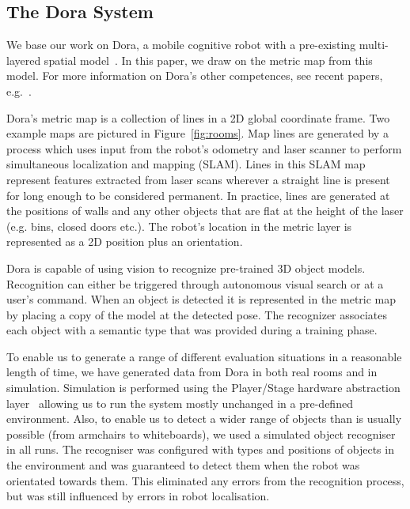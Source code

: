 \documentclass[letterpaper]{article}
\begin{document}
\subsection{The Dora System}

We base our work on Dora, a mobile cognitive robot with a pre-existing multi-layered spatial model~\cite{Hawes/etal:2011}. In this paper, we draw on the metric map from this model. For more information on Dora's other competences, see recent papers, e.g.~\cite{Hawes/etal:2011,Hanheide/etal:2011}.

Dora's metric map is a collection of lines in a 2D global coordinate frame. Two example maps are pictured in Figure~\ref{fig:rooms}. Map lines are generated by a process which uses input from the robot's odometry and laser scanner to perform simultaneous localization and mapping (SLAM). Lines in this SLAM map represent features extracted from laser scans wherever a straight line is present for long enough to be considered permanent. In practice, lines are generated at the positions of walls and any other objects that are flat at the height of the laser (e.g. bins, closed doors etc.). The robot's location in the metric layer is represented as a 2D position plus an orientation. 

Dora is capable of using vision to recognize pre-trained 3D object models. Recognition can either be triggered through autonomous visual search or at a user's command. When an object is detected it is represented in the metric map 
by placing a copy of the model at the detected pose. The recognizer associates each object with a semantic type that was provided during a training phase.

To enable us to generate a range of different evaluation situations in a reasonable length of time, we have generated data from Dora in both real rooms and in simulation. Simulation is performed using the Player/Stage hardware abstraction layer~\cite{GerkeyVaughanHoward03} allowing us to run the system mostly unchanged in a pre-defined environment. Also, to enable us to detect a wider range of objects than is usually possible (from armchairs to whiteboards), we used a simulated object recogniser in all runs. The recogniser was configured with types and positions of objects in the environment and was guaranteed to detect them when the robot was orientated towards them. This eliminated any errors from the recognition process, but was still influenced by errors in robot localisation.


\end{document}
